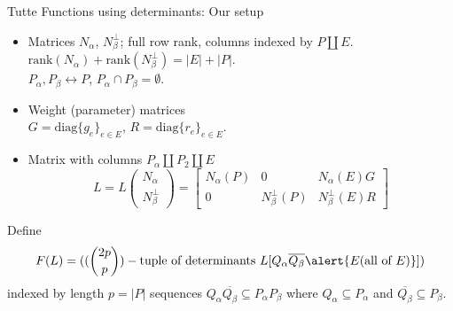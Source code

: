 \documentclass{beamer}
\newcommand{\dunion}{\coprod}
\newcommand{\ext}[1]{\ensuremath{\mathbf{#1}}}
\begin{document}
      
\newcommand{\Nal}{\ensuremath{N_{\alpha}}}
\newcommand{\NbePe}{\ensuremath{N_{\beta}^{\perp}}}
\newcommand{\eNal}{\ensuremath{\ext{N}_{\alpha}}}
\newcommand{\eNbePe}{\ensuremath{\ext{N}_{\beta}^{\perp}}}


\begin{frame}{Tutte Functions using determinants: Our setup}
  \begin{itemize}
  \item
    Matrices $\Nal$, $\NbePe$; full row rank, columns indexed by
    $P\dunion E$. $\text{rank}(\Nal)+\text{rank}(\NbePe)=|E|+|P|$.\\
    $P_{\alpha},P_{\beta}\leftrightarrow P$, $P_{\alpha}\cap P_{\beta}=\emptyset$.
  \item
    Weight (parameter) matrices\\
    $G=\text{diag}\{g_e\}_{e\in E} $,
    $R=\text{diag}\{r_e\}_{e\in E} $.
  \item
    Matrix with columns $P_\alpha \dunion P_2 \dunion E$
    \[
    L = L\left( \begin{array}{c} \Nal\\ \NbePe \end{array} \right)
    = \left[\begin{array}{c|c|c} \Nal(P)  &  0  &  \Nal(E)G \\  \hline
0  & \NbePe(P)  &  \NbePe(E)R \end{array}\right]
    \]
  \end{itemize}

  Define
  \[
  F(L)=((\binom{2p}{p})-\text{tuple of determinants\ } L[Q_\alpha \overline{Q_\beta} \alert{E(\text{all of }E)}])
  \]
  indexed by length $p=|P|$ sequences $Q_\alpha \overline{Q_\beta} \subseteq P_\alpha P_\beta$ where
  $Q_\alpha\subseteq P_\alpha$ and $\overline{Q_\beta}\subseteq P_\beta$.
    
\end{frame}
\end{document}
